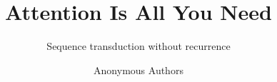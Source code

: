 \newif\ifChineseSlides
\ChineseSlidesfalse
\newcommand{\LatinFontPackage}{FiraSans}
\newcommand{\CJKFontSet}{fandol}
\title[Attention Is All You Need]{Attention Is All You Need}
\subtitle{Sequence transduction without recurrence}
\author{Anonymous Authors}
\newcommand{\Presenter}{Presented by Anonymous Presenter}
\institute{}
\newcommand{\HeaderInstitution}{}
\newcommand{\Contact}{}
\newcommand{\TalkType}{10-minute conference oral}
\date{}
